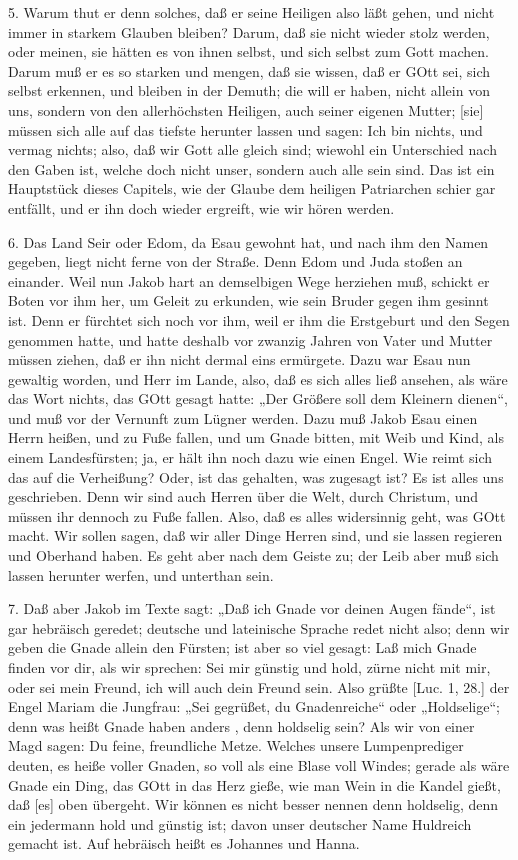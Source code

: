 5. Warum thut er denn solches, daß er seine Heiligen also läßt gehen, und nicht immer in starkem Glauben bleiben? Darum, daß sie nicht wieder stolz werden, oder meinen, sie hätten es von ihnen selbst, und sich selbst zum Gott machen. Darum muß er es so starken und mengen, daß sie wissen, daß er GOtt sei, sich selbst erkennen, und bleiben in der Demuth; die will er haben, nicht allein von uns, sondern von den allerhöchsten Heiligen, auch seiner eigenen Mutter; [sie] müssen sich alle auf das tiefste herunter lassen und sagen: Ich bin nichts, und vermag nichts; also, daß wir Gott alle gleich sind; wiewohl ein Unterschied nach den Gaben ist, welche doch nicht unser, sondern auch alle sein sind. Das ist ein Hauptstück dieses Capitels, wie der Glaube dem heiligen Patriarchen schier gar entfällt, und er ihn doch wieder ergreift, wie wir hören werden.

6. Das Land Seir oder Edom, da Esau gewohnt hat, und nach ihm den Namen gegeben, liegt nicht ferne von der Straße. Denn Edom und Juda stoßen an einander. Weil nun Jakob hart an demselbigen Wege herziehen muß, schickt er Boten vor ihm her, um Geleit zu erkunden, wie sein Bruder gegen ihm gesinnt ist. Denn er fürchtet sich noch vor ihm, weil er ihm die Erstgeburt und den Segen genommen hatte, und hatte deshalb vor zwanzig Jahren von Vater und Mutter müssen ziehen, daß er ihn nicht dermal eins ermürgete. Dazu war Esau nun gewaltig worden, und Herr im Lande, also, daß es sich alles ließ ansehen, als wäre das Wort nichts, das GOtt gesagt hatte: „Der Größere soll dem Kleinern dienen“, und muß vor der Vernunft zum Lügner werden. Dazu muß Jakob Esau einen Herrn heißen, und zu Fuße fallen, und um Gnade bitten, mit Weib und Kind, als einem Landesfürsten; ja, er hält ihn noch dazu wie einen Engel. Wie reimt sich das auf die Verheißung? Oder, ist das gehalten, was zugesagt ist? Es ist alles uns geschrieben. Denn wir sind auch Herren über die Welt, durch Christum, und müssen ihr dennoch zu Fuße fallen. Also, daß es alles widersinnig geht, was GOtt macht. Wir sollen sagen, daß wir aller Dinge Herren sind, und sie lassen regieren und Oberhand haben. Es geht aber nach dem Geiste zu; der Leib aber muß sich lassen herunter werfen, und unterthan sein.

7. Daß aber Jakob im Texte sagt: „Daß ich Gnade vor deinen Augen fände“, ist gar hebräisch geredet; deutsche und lateinische Sprache redet nicht also; denn wir geben die Gnade allein den Fürsten; ist aber so viel gesagt: Laß mich Gnade finden vor dir, als wir sprechen: Sei mir günstig und hold, zürne nicht mit mir, oder sei mein Freund, ich will auch dein Freund sein. Also grüßte [Luc. 1, 28.] der Engel Mariam die Jungfrau: „Sei gegrüßet, du Gnadenreiche“ oder „Holdselige“; denn was heißt Gnade haben anders
, denn holdselig sein? Als wir von einer Magd sagen: Du feine, freundliche Metze. Welches unsere Lumpenprediger deuten, es heiße voller Gnaden, so voll als eine Blase voll Windes; gerade als wäre Gnade ein Ding, das GOtt in das Herz gieße, wie man Wein in die Kandel gießt, daß [es] oben übergeht. Wir können es nicht besser nennen denn holdselig, denn ein jedermann hold und günstig ist; davon unser deutscher Name Huldreich gemacht ist. Auf hebräisch heißt es Johannes und Hanna.

